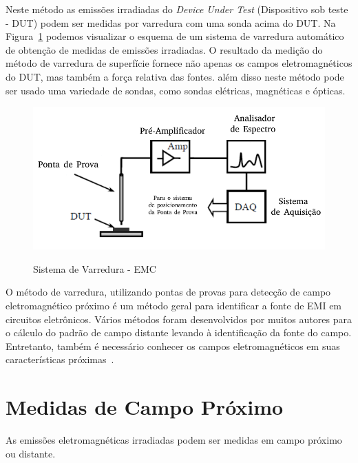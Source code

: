 Neste método as emissões irradiadas do \textit{Device Under Test} (Dispositivo sob teste - DUT) podem ser medidas por varredura com uma sonda acima do DUT. Na Figura~\ref{fig:scanning} podemos visualizar o esquema de um sistema de varredura automático de obtenção de medidas de emissões irradiadas. O resultado da medição do método de varredura de superfície fornece não apenas os campos eletromagnéticos do DUT, mas também a força relativa das fontes. além disso neste método pode ser usado uma variedade de sondas, como sondas elétricas, magnéticas e ópticas.

\begin{figure}[htb!]
	\centering 
	\caption{Sistema de Varredura - EMC}
	\includegraphics[scale=0.6]{./img/scanning_sistema}
	\label{fig:scanning}
\end{figure}

O método de varredura, utilizando pontas de provas para detecção de campo eletromagnético próximo é um método geral para identificar a fonte de EMI em circuitos eletrônicos. Vários métodos foram desenvolvidos por muitos autores para o cálculo do padrão de campo distante levando à identificação da fonte do campo. Entretanto, também é necessário conhecer os campos eletromagnéticos em suas características próximas~.


\section{Medidas de Campo Próximo}

As emissões eletromagnéticas irradiadas podem ser medidas em campo próximo ou distante. 

